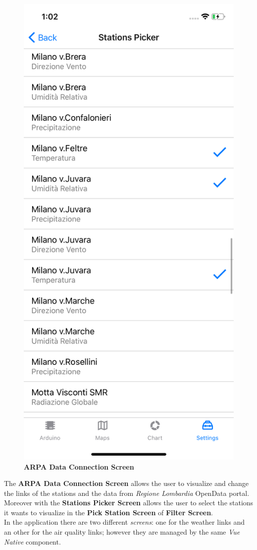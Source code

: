 \begin{figure}[H]
\includegraphics[height=.6\textheight]{./img/ui/stations_picker.png}
\caption{\textbf{ARPA Data Connection Screen}}
\end{figure}
\begin{center}
The \textbf{ARPA Data Connection Screen} allows the user to visualize and change the links of the stations and the data from \textit{Regione Lombardia} OpenData portal.\\ Moreover with the \textbf{Stations Picker Screen} allows the user to select the stations it wants to visualize in the \textbf{Pick Station Screen} of \textbf{Filter Screen}.\\
In the application there are two different \textit{screens}: one for the weather links and an other for the air quality links; however they are managed by the same \textit{Vue Native} component.
\end{center}